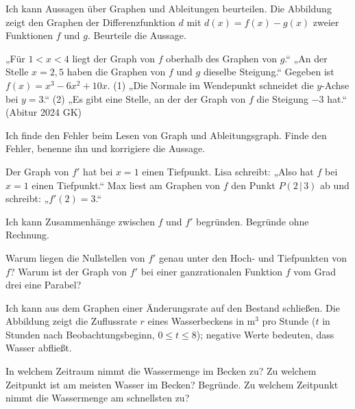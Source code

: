 \begin{aufgabe}{Ich kann Aussagen über Graphen und Ableitungen beurteilen.}
Die Abbildung zeigt den Graphen der Differenzfunktion $d$ mit $d(x) = f(x) - g(x)$ zweier Funktionen $f$ und $g$. Beurteile die Aussage.

\begin{ksys}[xmin=0,xmax=5,ymin=-4,ymax=3,ablesen]
\end{ksys}

\begin{teile}
\teil „Für $1 < x < 4$ liegt der Graph von $f$ oberhalb des Graphen von $g$.“
\teil „An der Stelle $x = 2{,}5$ haben die Graphen von $f$ und $g$ dieselbe Steigung.“
\teil Gegeben ist $f(x) = x^3 - 6x^2 + 10x$. (1) „Die Normale im Wendepunkt schneidet die $y$-Achse bei $y = 3$.“ (2) „Es gibt eine Stelle, an der der Graph von $f$ die Steigung $-3$ hat.“ (Abitur 2024 GK)
\end{teile}
\end{aufgabe}

\begin{aufgabe}{Ich finde den Fehler beim Lesen von Graph und Ableitungsgraph.}
Finde den Fehler, benenne ihn und korrigiere die Aussage.
\begin{teile}
\teil Der Graph von $f'$ hat bei $x = 1$ einen Tiefpunkt. Lisa schreibt: „Also hat $f$ bei $x = 1$ einen Tiefpunkt.“
\teil Max liest am Graphen von $f$ den Punkt $P(2\,|\,3)$ ab und schreibt: „$f'(2) = 3$.“
\end{teile}
\end{aufgabe}

\begin{aufgabe}{Ich kann Zusammenhänge zwischen $f$ und $f'$ begründen.}
Begründe ohne Rechnung.
\begin{teile}
\teil Warum liegen die Nullstellen von $f'$ genau unter den Hoch- und Tiefpunkten von $f$?
\teil Warum ist der Graph von $f'$ bei einer ganzrationalen Funktion $f$ vom Grad drei eine Parabel?
\end{teile}
\end{aufgabe}

\begin{aufgabe}{Ich kann aus dem Graphen einer Änderungsrate auf den Bestand schließen.}
Die Abbildung zeigt die Zuflussrate $r$ eines Wasserbeckens in m$^3$ pro Stunde ($t$ in Stunden nach Beobachtungsbeginn, $0 \le t \le 8$); negative Werte bedeuten, dass Wasser abfließt.

\begin{ksys}[xmin=0,xmax=8,ymin=-4,ymax=5,ablesen,xlabel=$t$,ylabel=$r(t)$]
\end{ksys}

\begin{teile}
\teil In welchem Zeitraum nimmt die Wassermenge im Becken zu?
\teil Zu welchem Zeitpunkt ist am meisten Wasser im Becken? Begründe.
\teil Zu welchem Zeitpunkt nimmt die Wassermenge am schnellsten zu?
\end{teile}
\end{aufgabe}
